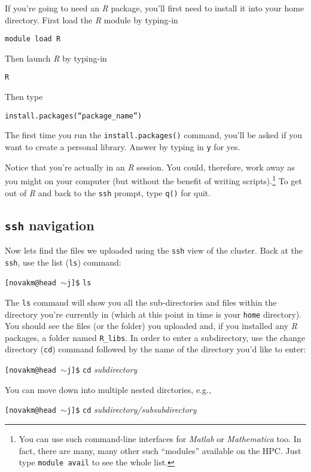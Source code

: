 \documentclass[12pt,letterpaper]{article}
\begin{document}
\noindent
If you're going to need an \emph{R} package, you'll first need to install it into your home directory.
First load the \emph{R} module by typing-in

 \texttt{module load R}

 \noindent
 Then launch \emph{R} by typing-in

 \texttt{R}

 \noindent
 Then type

 \texttt{install.packages(``\emph{package\_name}'')}

 \noindent
The first time you run the \texttt{install.packages()} command, you'll be asked if you want to create a personal library.
Answer by typing in \texttt{y} for yes.

\noindent
Notice that you're actually in an \emph{R} session.
You could, therefore, work away as you might on your computer (but without the benefit of writing scripts).\footnote{You can use such command-line interfaces for \emph{Matlab} or \emph{Mathematica} too.
In fact, there are many, many other  such ``modules''  available on the HPC.
Just type \texttt{module avail} to see the whole list.}
To get out of \emph{R} and back to the \texttt{ssh} prompt, type \texttt{q()} for quit.


\subsection{\texttt{ssh} navigation}
Now lets find the files we uploaded using the \texttt{ssh} view of the cluster.
Back at the \texttt{ssh}, use the list (\texttt{ls}) command:

\texttt{[novakm@head $\sim$j]\$} \texttt{ls}

\noindent
The \texttt{ls} command will show you all the sub-directories and files within the directory you're currently in (which at this point in time is your \texttt{home} directory).
You should see the files (or the folder) you uploaded and, if you installed any \emph{R} packages, a folder named \texttt{R\_libs}.
In order to enter a subdirectory, use the change directory (\texttt{cd}) command followed by the name of the directory you'd like to enter:

\texttt{[novakm@head $\sim$j]\$} \texttt{cd} \emph{subdirectory}

\noindent
You can move down into multiple nested dirctories, e.g.,

\texttt{[novakm@head $\sim$j]\$}  \texttt{cd} \emph{subdirectory/subsubdirectory}
\end{document}
